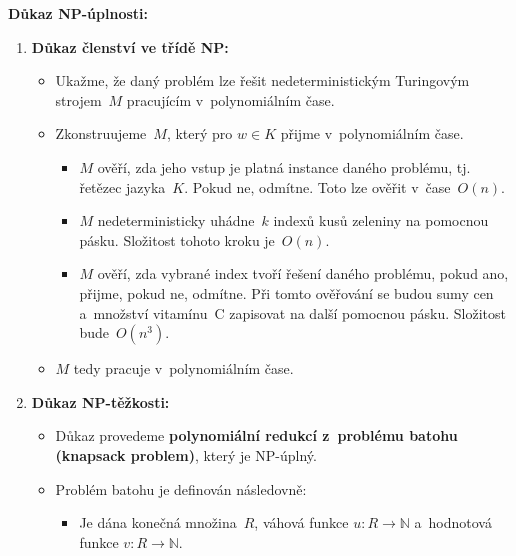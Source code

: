 \documentclass[a4paper, 11pt, fleqn]{scrartcl}
\begin{document}
	\textbf{Důkaz NP-úplnosti:}
	\begin{enumerate}
		\item
			\textbf{Důkaz členství ve třídě NP:}

			\begin{itemize}
				\item
					Ukažme, že daný problém lze řešit nedeterministickým
					Turingovým strojem~$ M $ pracujícím v~polynomiálním
					čase.

				\item
					Zkonstruujeme~$ M $, který pro $ w \in K $ přijme
					v~polynomiálním čase.

					\begin{itemize}
						\item
							$ M $ ověří, zda jeho vstup je platná instance
							daného problému, tj. řetězec jazyka~$ K $.
							Pokud ne, odmítne. Toto lze ověřit
							v~čase~$ O(n) $.

						\item
							$ M $ nedeterministicky uhádne~$ k $ indexů
							kusů zeleniny na pomocnou pásku. Složitost
							tohoto kroku je~$ O(n) $.

						\item
							$ M $ ověří, zda vybrané index tvoří řešení
							daného problému, pokud ano, přijme, pokud ne,
							odmítne. Při tomto ověřování se budou sumy
							cen a~množství vitamínu~C zapisovat na další
							pomocnou pásku. Složitost bude~$ O(n^3) $.
					\end{itemize}

				\item
					$ M $ tedy pracuje v~polynomiálním čase.
			\end{itemize}

		\item
			\textbf{Důkaz NP-těžkosti:}

			\begin{itemize}
				\item
					Důkaz provedeme \textbf{polynomiální redukcí
					z~problému batohu (knapsack problem)}, který je
					NP-úplný.

				\item
					Problém batohu je definován následovně:

					\begin{itemize}
						\item
							Je dána konečná množina~$ R $, váhová
							funkce $ u : R \rightarrow \mathbb{N} $
							a~hodnotová funkce $ v : R \rightarrow
							\mathbb{N} $.


\end{itemize}
\end{itemize}
\end{enumerate}
\end{document}
